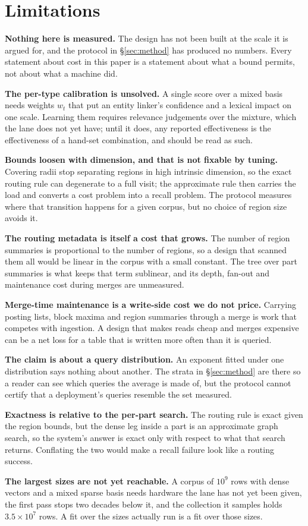 \section{Limitations}
\label{sec:limits}

\textbf{Nothing here is measured.} The design has not been built at the scale
it is argued for, and the protocol in \S\ref{sec:method} has produced no
numbers. Every statement about cost in this paper is a statement about what a
bound permits, not about what a machine did.

\textbf{The per-type calibration is unsolved.} A single score over a mixed
basis needs weights $w_t$ that put an entity linker's confidence and a lexical
impact on one scale. Learning them requires relevance judgements over the
mixture, which the lane does not yet have; until it does, any reported
effectiveness is the effectiveness of a hand-set combination, and should be
read as such.

\textbf{Bounds loosen with dimension, and that is not fixable by tuning.}
Covering radii stop separating regions in high intrinsic dimension, so the
exact routing rule can degenerate to a full visit; the approximate rule then
carries the load and converts a cost problem into a recall problem. The
protocol measures where that transition happens for a given corpus, but no
choice of region size avoids it.

\textbf{The routing metadata is itself a cost that grows.} The number of region
summaries is proportional to the number of regions, so a design that scanned
them all would be linear in the corpus with a small constant. The tree over
part summaries is what keeps that term sublinear, and its depth, fan-out and
maintenance cost during merges are unmeasured.

\textbf{Merge-time maintenance is a write-side cost we do not price.} Carrying
posting lists, block maxima and region summaries through a merge is work that
competes with ingestion. A design that makes reads cheap and merges expensive
can be a net loss for a table that is written more often than it is queried.

\textbf{The claim is about a query distribution.} An exponent fitted under one
distribution says nothing about another. The strata in \S\ref{sec:method} are
there so a reader can see which queries the average is made of, but the
protocol cannot certify that a deployment's queries resemble the set measured.

\textbf{Exactness is relative to the per-part search.} The routing rule is
exact given the region bounds, but the dense leg inside a part is an
approximate graph search, so the system's answer is exact only with respect to
what that search returns. Conflating the two would make a recall failure look
like a routing success.

\textbf{The largest sizes are not yet reachable.} A corpus of $10^9$ rows with
dense vectors and a mixed sparse basis needs hardware the lane has not yet been
given, the first pass stops two decades below it, and the collection it samples
holds $3.5 \times 10^7$ rows. A fit over the sizes actually run is a fit over
those sizes.
